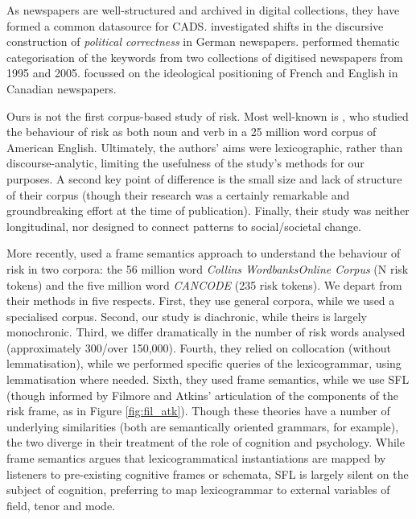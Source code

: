 		\noindent As newspapers are well-structured and archived in digital collections, they have formed a common datasource for CADS.  investigated shifts in the discursive construction of \emph{political correctness} in German newspapers.  performed thematic categorisation of the keywords from two collections of digitised newspapers from 1995 and 2005.  focussed on the ideological positioning of French and English in Canadian newspapers. %

		Ours is not the first corpus-based study of risk. Most well-known is , who studied the behaviour of risk as both noun and verb in a 25 million word corpus of American English. Ultimately, the authors' aims were lexicographic, rather than discourse-analytic, limiting the usefulness of the study's methods for our purposes. A second key point of difference is the small size and lack of structure of their corpus (though their research was a certainly remarkable and groundbreaking effort at the time of publication). Finally, their study was neither longitudinal, nor designed to connect patterns to social/societal change.

		More recently,  used a frame semantics approach to understand the behaviour of risk in two corpora: the 56 million word \emph{Collins WordbanksOnline Corpus} (N risk tokens) and the five million word \emph{CANCODE} (235 risk tokens). 
		We depart from their methods in five respects. First, they use general corpora, while we used a specialised corpus. Second, our study is diachronic, while theirs is largely monochronic. Third, we differ dramatically in the number of risk words analysed (approximately 300/over 150,000). Fourth, they relied on collocation (without lemmatisation), while we performed specific queries of the lexicogrammar, using lemmatisation where needed. Sixth, they used frame semantics, while we use SFL (though informed by Filmore and Atkins' \citeyear{fillmore_toward_1992} articulation of the components of the risk frame, as in Figure \ref{fig:fil_atk}). Though these theories have a number of underlying similarities (both are semantically oriented grammars, for example), the two diverge in their treatment of the role of cognition and psychology. While frame semantics argues that lexicogrammatical instantiations are mapped by listeners to pre-existing cognitive frames or schemata, SFL is largely silent on the subject of cognition, preferring to map lexicogrammar to external variables of field, tenor and mode.

